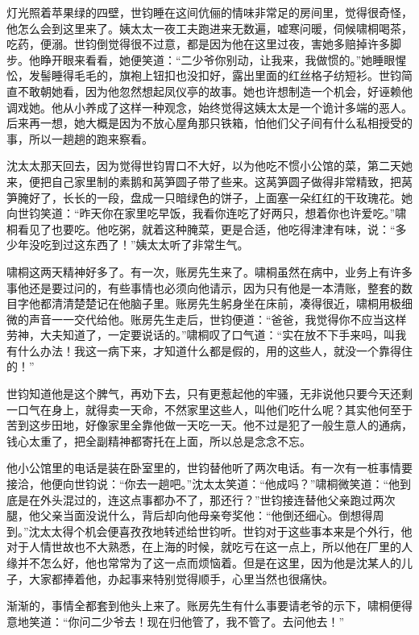 \par 灯光照着苹果绿的四壁，世钧睡在这间伉俪的情味非常足的房间里，觉得很奇怪，他怎么会到这里来了。姨太太一夜工夫跑进来无数遍，嘘寒问暖，伺候啸桐喝茶，吃药，便溺。世钧倒觉得很不过意，都是因为他在这里过夜，害她多赔掉许多脚步。他睁开眼来看看，她便笑道：“二少爷你别动，让我来，我做惯的。”她睡眼惺忪，发髻睡得毛毛的，旗袍上钮扣也没扣好，露出里面的红丝格子纺短衫。世钧简直不敢朝她看，因为他忽然想起凤仪亭的故事。她也许想制造一个机会，好诬赖他调戏她。他从小养成了这样一种观念，始终觉得这姨太太是一个诡计多端的恶人。后来再一想，她大概是因为不放心屋角那只铁箱，怕他们父子间有什么私相授受的事，所以一趟趟的跑来察看。
\par 沈太太那天回去，因为觉得世钧胃口不大好，以为他吃不惯小公馆的菜，第二天她来，便把自己家里制的素鹅和莴笋圆子带了些来。这莴笋圆子做得非常精致，把莴笋腌好了，长长的一段，盘成一只暗绿色的饼子，上面塞一朵红红的干玫瑰花。她向世钧笑道：“昨天你在家里吃早饭，我看你连吃了好两只，想着你也许爱吃。”啸桐看见了也要吃。他吃粥，就着这种腌菜，更是合适，他吃得津津有味，说：“多少年没吃到过这东西了！”姨太太听了非常生气。
\par 啸桐这两天精神好多了。有一次，账房先生来了。啸桐虽然在病中，业务上有许多事他还是要过问的，有些事情也必须向他请示，因为只有他是一本清账，整套的数目字他都清清楚楚记在他脑子里。账房先生躬身坐在床前，凑得很近，啸桐用极细微的声音一一交代给他。账房先生走后，世钧便道：“爸爸，我觉得你不应当这样劳神，大夫知道了，一定要说话的。”啸桐叹了口气道：“实在放不下手来吗，叫我有什么办法！我这一病下来，才知道什么都是假的，用的这些人，就没一个靠得住的！”
\par 世钧知道他是这个脾气，再劝下去，只有更惹起他的牢骚，无非说他只要今天还剩一口气在身上，就得卖一天命，不然家里这些人，叫他们吃什么呢？其实他何至于苦到这步田地，好像家里全靠他做一天吃一天。他不过是犯了一般生意人的通病，钱心太重了，把全副精神都寄托在上面，所以总是念念不忘。
\par 他小公馆里的电话是装在卧室里的，世钧替他听了两次电话。有一次有一桩事情要接洽，他便向世钧说：“你去一趟吧。”沈太太笑道：“他成吗？”啸桐微笑道：“他到底是在外头混过的，连这点事都办不了，那还行？”世钧接连替他父亲跑过两次腿，他父亲当面没说什么，背后却向他母亲夸奖他：“他倒还细心。倒想得周到。”沈太太得个机会便喜孜孜地转述给世钧听。世钧对于这些事本来是个外行，他对于人情世故也不大熟悉，在上海的时候，就吃亏在这一点上，所以他在厂里的人缘并不怎么好，他也常常为了这一点而烦恼着。但是在这里，因为他是沈某人的儿子，大家都捧着他，办起事来特别觉得顺手，心里当然也很痛快。
\par 渐渐的，事情全都套到他头上来了。账房先生有什么事要请老爷的示下，啸桐便得意地笑道：“你问二少爷去！现在归他管了，我不管了。去问他去！”
